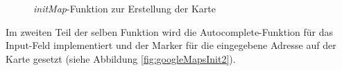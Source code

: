 \begin{figure}[!bh]
	\caption{\textit{initMap}-Funktion zur Erstellung der Karte}
	\label{fig:googleMapsInit}
\end{figure}

Im zweiten Teil der selben Funktion wird die Autocomplete-Funktion für das Input-Feld implementiert und der Marker für die eingegebene Adresse auf der Karte gesetzt (siehe Abbildung \vref{fig:googleMapsInit2}).

